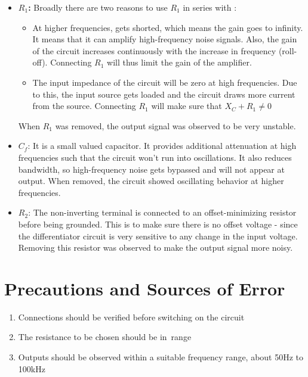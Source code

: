 \begin{itemize}
    \item \textbf{$R_1$:} Broadly there are two reasons to use $R_1$ in series with :
        \begin{itemize}
            \item At higher frequencies,  gets shorted, which means the gain goes to infinity. It means that it can amplify high-frequency noise signals. Also, the gain of the circuit increases continuously with the increase in frequency (roll-off). Connecting $R_1$ will thus limit the gain of the amplifier.
            \item The input impedance of the circuit will be zero at high frequencies. Due to this, the input source gets loaded and the circuit draws more current from the source. Connecting $R_1$ will make sure that $X_C+R_1\ne 0$
        \end{itemize}
    
    When $R_1$ was removed, the output signal was observed to be very unstable.\\
    
    \item $C_f$: It is a small valued capacitor. It provides additional attenuation at high frequencies such that the circuit won't run into oscillations. It also reduces bandwidth, so high-frequency noise gets bypassed and will not appear at output. When removed, the circuit showed oscillating behavior at higher frequencies.\\
    \item $R_2$: The non-inverting terminal is connected to an offset-minimizing resistor before being grounded. This is to make sure there is no offset voltage - since the differentiator circuit is very sensitive to any change in the input voltage. Removing this resistor was observed to make the output signal more noisy.
\end{itemize}

\section{Precautions and Sources of Error}

    \begin{enumerate}
        \item Connections should be verified before switching on the circuit
        \item The resistance to be chosen should be in \kohm\,range
        \item Outputs should be observed within a suitable frequency range, about 50Hz to 100kHz
    \end{enumerate}

